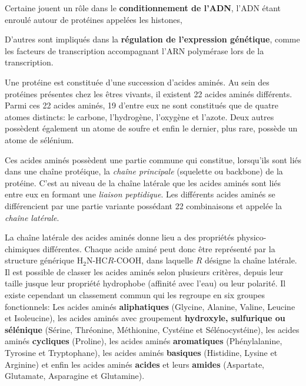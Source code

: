 Certaine jouent un rôle dans le \textbf{conditionnement de l'ADN}, l'ADN étant enroulé autour de protéines appelées les histones, 


D'autres sont impliqués dans la \textbf{régulation de l'expression génétique}, comme les facteurs de transcription accompagnant l'ARN polymérase lors de la transcription.


Une protéine est constituée d'une succession d'acides aminés. Au sein des protéines présentes chez les êtres vivants, il existent 22 acides aminés différents. Parmi ces 22 acides aminés, 19 d'entre eux ne sont constitués que de quatre atomes distincts: le carbone, l'hydrogène, l'oxygène et l'azote. Deux autres possèdent également un atome de soufre et enfin le dernier, plus rare, possède un atome de sélénium. 


Ces acides aminés possèdent une partie commune qui constitue, lorsqu'ils sont liés dans une chaîne protéique, la \textit{chaîne principale} (squelette ou backbone) de la protéine. C'est au niveau de la chaîne latérale que les acides aminés sont liés entre eux en formant une \textit{liaison peptidique}. Les différents acides aminés se différencient par une partie variante possédant 22 combinaisons et appelée la \textit{chaîne latérale}. 


La chaîne latérale des acides aminés donne lieu a des propriétés physico-chimiques différentes. Chaque acide aminé peut donc être représenté par la structure générique H$_{2}$N-HC$R$-COOH, dans laquelle $R$ désigne la chaîne latérale. 
Il est possible de classer les acides aminés selon plusieurs critères, depuis leur taille jusque leur propriété hydrophobe (affinité avec l'eau) ou leur polarité. Il existe cependant un classement commun qui les regroupe en six groupes fonctionnels: Les acides aminés \textbf{aliphatiques} (Glycine, Alanine, Valine, Leucine et Isoleucine), les acides aminés avec groupement \textbf{hydroxyle, sulfurique ou sélénique} (Sérine, Thréonine, Méthionine, Cystéine et Sélénocystéine), les acides aminés \textbf{cycliques} (Proline), les acides aminés \textbf{aromatiques} (Phénylalanine, Tyrosine et Tryptophane), les acides aminés \textbf{basiques} (Histidine, Lysine et Arginine) et enfin les acides aminés \textbf{acides} et leurs \textbf{amides} (Aspartate, Glutamate, Asparagine et Glutamine).

